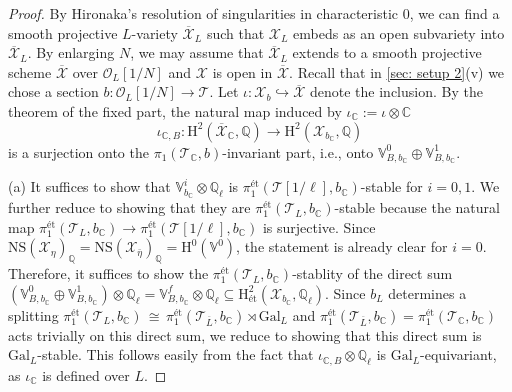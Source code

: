 \documentclass[letter, 11pt]{article}
\theoremstyle{plain}
\theoremstyle{definition}
\newcommand{\IC}{\mathbb{C}}
\newcommand{\IQ}{\mathbb{Q}}
\newcommand{\IV}{\mathbb{V}}
\newcommand\iso{\,{\cong}\,}
\newcommand\tensor{{\otimes}}
\newcommand{\<}{\langle}
\renewcommand{\>}{\rangle}
\newcommand{\into}{\hookrightarrow}
\newcommand{\sX}{\mathcal{X}}
\newcommand{\sT}{\mathcal{T}}
\newcommand{\sO}{\mathcal{O}}
\renewcommand{\H}{\mathrm{H}}
\newcommand{\et}{\textrm{{\'e}t}}
\newcommand{\NS}{\mathrm{NS}}
\newcommand{\Gal}{\mathrm{Gal}}
\newcommand{\mpr}{}
\begin{document}
\begin{proof}
 By Hironaka's resolution of singularities in characteristic $0$, we can find  a smooth projective $L$-variety $\overline{\sX}_L$ such that $\sX_L$ embeds as an open subvariety into $\overline{\sX}_L$. By enlarging $N$, we may assume that $\overline{\sX}_L$ extends to a smooth projective scheme $\overline{\sX}$ over $\sO_L[1/N]$ and $\sX$ is open in $\overline{\sX}$. Recall that in \ref{sec: setup 2}(v) we chose a section $b : \sO_L[1/N] \to \sT$. \mpr{Let $\iota: \sX_b \into \overline{\sX}$ denote the inclusion.} By the theorem of the fixed part, the natural map induced by $\iota_\IC := \iota \tensor \IC$ 
    \begin{equation}
        \label{eqn: invariant cycle}
        \iota_{\IC, B} : \H^2(\overline{\sX}_\IC, \IQ) \to \H^2(\sX_{b_\IC}, \IQ)
    \end{equation}
    is a surjection onto the $\pi_1(\sT_\IC, b)$-invariant part, i.e., onto $\IV^0_{B, b_\IC} \oplus \IV^1_{B, b_\IC}$. 

    (a) It suffices to show that $\IV^i_{b_\IC} \tensor \IQ_\ell$ is $\pi_1^\et(\sT[1/\ell], b_\IC)$-stable for $i = 0, 1$. We further reduce to showing that they are $\pi_1^\et(\sT_L, b_\IC)$-stable because the natural map $\pi_1^\et(\sT_L, b_\IC) \to \pi_1^\et(\sT[1/\ell], b_\IC)$ is surjective. Since $\NS(\sX_\eta)_\IQ = \NS(\sX_{\bar{\eta}})_\IQ = \H^0(\IV^0)$, the statement is already clear for $i = 0$. Therefore, it suffices to show the $\pi_1^\et(\sT_L, b_\IC)$-stablity of the direct sum $(\IV^0_{B, b_\IC} \oplus \IV^1_{B, b_\IC}) \tensor \IQ_\ell = \IV^f_{B, b_\IC} \tensor \IQ_\ell \subseteq \H^2_\et(\sX_{b_\IC}, \IQ_\ell)$. Since $b_L$ determines a splitting $\pi_1^\et(\sT_L, b_\IC) \iso \pi_1^\et(\sT_{\overline{L}}, b_\IC) \rtimes \Gal_{L}$ and $\pi_1^\et(\sT_{\overline{L}}, b_\IC) = \pi_1^\et(\sT_\IC, b_\IC)$ acts trivially on this direct sum, we reduce to showing that this direct sum is $\Gal_L$-stable. This follows easily from the fact that $\iota_{\IC, B} \tensor \IQ_\ell$ is $\Gal_L$-equivariant, as $\iota_\IC$ is defined over $L$. 


\end{proof}
\end{document}

